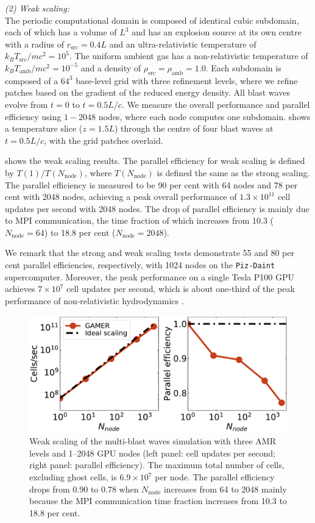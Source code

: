    \emph{(2) Weak scaling:}\\
    The periodic computational domain is composed of identical cubic subdomain, each of which has a volume of $L^3$ and has an explosion source at its own centre with a radius of $r_{\text{src}}=0.4L$ and an ultra-relativistic temperature of $k_{B}T_{\text{src}}/mc^2=10^{5}$. The uniform ambient gas has a non-relativistic temperature of $k_{B}T_{\text{amb}}/mc^2=10^{-5}$ and a density of $\rho_{\text{src}}=\rho_{\text{amb}}=1.0$. Each subdomain is composed of a $64^3$ base-level grid with three refinement levels, where we refine patches based on the gradient of the reduced energy density. All blast waves evolve from $t=0$ to $t=0.5L/c$. We measure the overall performance and parallel efficiency using $1-2048$ nodes, where each node computes one subdomain.  shows a temperature slice ($z=1.5L$) through the centre of four blast waves at $t=0.5L/c$, with the grid patches overlaid.

 shows the weak scaling results. The parallel efficiency for weak scaling is defined by $T(1)/T(N_{\text{node}})$, where $T(N_{\text{node}})$ is defined the same as the strong scaling. The parallel efficiency is measured to be 90 per cent with 64 nodes and 78 per cent with 2048 nodes, achieving a peak overall performance of $1.3\times 10^{11}$ cell updates per second with 2048 nodes. The drop of parallel efficiency is mainly due to MPI communication, the time fraction of which increases from 10.3 ($N_{\text{node}}=64$) to 18.8 per cent ($N_{\text{node}}=2048$).

We remark that the strong and weak scaling tests demonstrate 55 and 80 per cent parallel efficiencies, respectively, with 1024 nodes on the \texttt{Piz-Daint} supercomputer. Moreover, the peak performance on a single Tesla P100 GPU achieves $7\times 10^{7}$ cell updates per second, which is about one-third of the peak performance of non-relativistic hydrodynamics \citep{gamer-2}.


\begin{figure}
\includegraphics[width=\columnwidth]{srhd-figures/fig__benchmark_weakscaling.pdf}
\caption{Weak scaling of the multi-blast waves simulation with three AMR levels and 1--2048 GPU nodes (left panel: cell updates per second; right panel: parallel efficiency). The maximum total number of cells, excluding ghost cells, is $6.9\times 10^{7}$ per node. The parallel efficiency drops from 0.90 to 0.78 when $N_{\text{node}}$ increases from 64 to 2048 mainly because the MPI communication time fraction increases from 10.3 to 18.8 per cent.}
\label{fig:weak scaling}
\end{figure}





